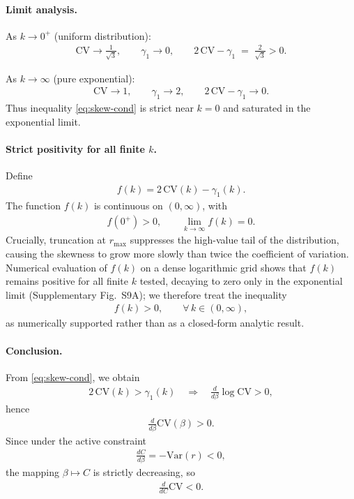 \documentclass[11pt]{article}
\theoremstyle{remark}
\theoremstyle{definition}
\begin{document}
\paragraph{Limit analysis.}

As $k\to 0^{+}$ (uniform distribution):
\begin{align}
\mathrm{CV}\to \frac{1}{\sqrt{3}},\qquad
\gamma_1\to 0,
\qquad
2\,\mathrm{CV}-\gamma_1
\;=\;\frac{2}{\sqrt{3}}>0.
\end{align}

As $k\to\infty$ (pure exponential):
\begin{align}
\mathrm{CV}\to 1,\qquad
\gamma_1\to 2,
\qquad
2\,\mathrm{CV}-\gamma_1
\to 0.
\end{align}
Thus inequality \eqref{eq:skew-cond} is strict near $k=0$ and saturated
in the exponential limit.

\paragraph{Strict positivity for all finite $k$.}

Define
\begin{align}
f(k)=2\,\mathrm{CV}(k)-\gamma_1(k).
\end{align}
The function $f(k)$ is continuous on $(0,\infty)$, with
\begin{align}
f(0^{+})>0,
\qquad
\lim_{k\to\infty} f(k)=0.
\end{align}
Crucially, truncation at $r_{\max}$ suppresses the high-value tail of
the distribution, causing the skewness to grow more slowly than twice
the coefficient of variation.  Numerical evaluation of $f(k)$ on a
dense logarithmic grid shows that $f(k)$ remains positive for all
finite $k$ tested, decaying to zero only in the exponential limit
(Supplementary Fig.~S9A); we therefore treat the inequality
\begin{align}
f(k)>0,\qquad \forall\, k\in(0,\infty),
\end{align}
as numerically supported rather than as a closed-form analytic
result.

\paragraph{Conclusion.}

From \eqref{eq:skew-cond}, we obtain
\begin{align}
2\,\mathrm{CV}(k)>\gamma_1(k)
\quad\Longrightarrow\quad
\frac{d}{d\beta}\log\mathrm{CV}>0,
\end{align}
hence
\begin{align}
\frac{d}{d\beta}\mathrm{CV}(\beta)>0.
\end{align}
Since under the active constraint
\begin{align}
\frac{dC}{d\beta}
= -\mathrm{Var}(r)<0,
\end{align}
the mapping $\beta\mapsto C$ is strictly decreasing, so
\begin{align}
\frac{d}{dC}\mathrm{CV}<0.
\end{align}
\end{document}
